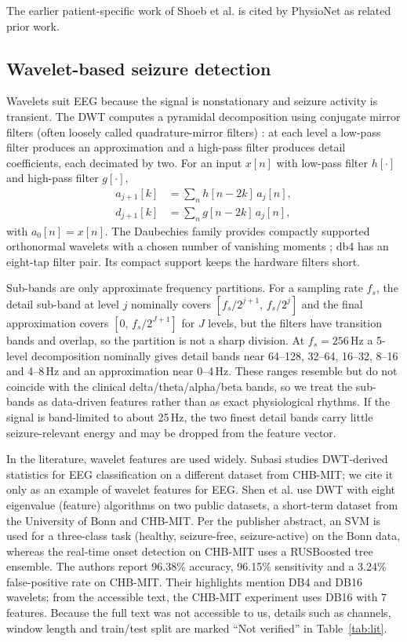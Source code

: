 \documentclass[10pt,twocolumn,letterpaper]{article}
\begin{document}
The earlier patient-specific work of Shoeb et al. \cite{shoeb2004patient}
is cited by PhysioNet as related prior work.

\subsection{Wavelet-based seizure detection}

Wavelets suit EEG because the signal is nonstationary and seizure
activity is transient. The DWT computes a pyramidal decomposition using
conjugate mirror filters (often loosely called quadrature-mirror
filters) \cite{mallat1989theory}: at each level a low-pass filter
produces an approximation and a high-pass filter produces detail
coefficients, each decimated by two. For an input $x[n]$ with low-pass
filter $h[\cdot]$ and high-pass filter $g[\cdot]$,
\begin{align}
a_{j+1}[k] &= \sum_n h[n-2k]\,a_j[n], \\
d_{j+1}[k] &= \sum_n g[n-2k]\,a_j[n],
\end{align}
with $a_0[n]=x[n]$. The Daubechies family provides compactly supported
orthonormal wavelets with a chosen number of vanishing moments
\cite{daubechies1988orthonormal}; db4 has an eight-tap filter pair. Its
compact support keeps the hardware filters short.

Sub-bands are only approximate frequency partitions. For a sampling rate
$f_s$, the detail sub-band at level $j$ nominally covers
$[f_s/2^{j+1},\,f_s/2^{j}]$ and the final approximation covers
$[0,\,f_s/2^{J+1}]$ for $J$ levels, but the filters have transition
bands and overlap, so the partition is not a sharp division. At
$f_s=256$\,Hz a 5-level decomposition nominally gives detail bands near
64--128, 32--64, 16--32, 8--16 and 4--8\,Hz and an approximation near
0--4\,Hz. These ranges resemble but do not coincide with the clinical
delta/theta/alpha/beta bands, so we treat the sub-bands as data-driven
features rather than as exact physiological rhythms. If the signal is
band-limited to about 25\,Hz, the two finest detail bands carry little
seizure-relevant energy and may be dropped from the feature vector.

In the literature, wavelet features are used widely. Subasi
\cite{subasi2007eeg} studies DWT-derived statistics for EEG
classification on a different dataset from CHB-MIT; we cite it only as an
example of wavelet features for EEG.
Shen et al. \cite{shen2022dwt} use DWT with eight eigenvalue (feature)
algorithms on two public datasets, a short-term dataset from the
University of Bonn and CHB-MIT. Per the publisher abstract, an SVM is
used for a three-class task (healthy, seizure-free, seizure-active) on
the Bonn data, whereas the real-time onset detection on CHB-MIT uses a
RUSBoosted tree ensemble. The authors report 96.38\% accuracy, 96.15\%
sensitivity and a 3.24\% false-positive rate on CHB-MIT. Their
highlights mention DB4 and DB16 wavelets; from the accessible text, the
CHB-MIT experiment uses DB16 with 7 features. Because the full text was
not accessible to us, details such as channels, window length and
train/test split are marked ``Not verified'' in Table~\ref{tab:lit}.
\end{document}
